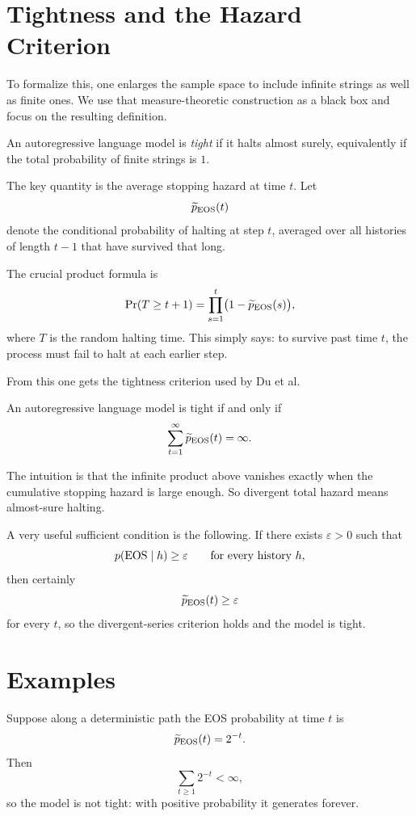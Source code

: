 \section{Tightness and the Hazard Criterion}

To formalize this, one enlarges the sample space to include infinite strings as well as finite ones. We use that measure-theoretic construction as a black box and focus on the resulting definition.

\begin{definition}
An autoregressive language model is \emph{tight} if it halts almost surely, equivalently if the total probability of finite strings is $1$.
\end{definition}

The key quantity is the average stopping hazard at time $t$. Let
\[
  \widetilde p_{\operatorname{EOS}}(t)
\]
denote the conditional probability of halting at step $t$, averaged over all histories of length $t-1$ that have survived that long.

The crucial product formula is
\[
  \Pr(T \ge t+1) = \prod_{s=1}^{t} \bigl(1-\widetilde p_{\operatorname{EOS}}(s)\bigr),
\]
where $T$ is the random halting time. This simply says: to survive past time $t$, the process must fail to halt at each earlier step.

From this one gets the tightness criterion used by Du et al.

\begin{theorem}
An autoregressive language model is tight if and only if
\[
  \sum_{t=1}^{\infty} \widetilde p_{\operatorname{EOS}}(t) = \infty.
\]
\end{theorem}

The intuition is that the infinite product above vanishes exactly when the cumulative stopping hazard is large enough. So divergent total hazard means almost-sure halting.

A very useful sufficient condition is the following. If there exists $\varepsilon > 0$ such that
\[
  p(\operatorname{EOS} \mid h) \ge \varepsilon
  \qquad\text{for every history } h,
\]
then certainly
\[
  \widetilde p_{\operatorname{EOS}}(t) \ge \varepsilon
\]
for every $t$, so the divergent-series criterion holds and the model is tight.

\section{Examples}

\begin{example}
Suppose along a deterministic path the EOS probability at time $t$ is
\[
  \widetilde p_{\operatorname{EOS}}(t) = 2^{-t}.
\]
Then
\[
  \sum_{t \ge 1} 2^{-t} < \infty,
\]
so the model is not tight: with positive probability it generates forever.
\end{example}

